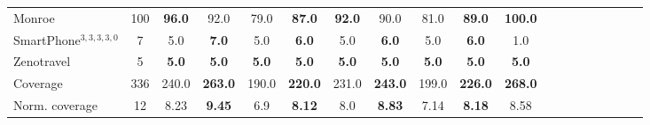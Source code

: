 \documentclass[letterpaper]{article} %
\begin{document}
\begin{table}
{\begin{tabular}{lccccccccccccccccccl}
			\midrule 
			Monroe & 100 & \textbf{96.0} & 92.0 & 79.0 & \textbf{87.0} & \textbf{92.0} & 90.0 & 81.0 & \textbf{89.0} &\multicolumn{2}{c}{ \textbf{100.0}  } \\ 
			SmartPhone$^{3,3,3,3,0}$ & 7 & 5.0 & \textbf{7.0} & 5.0 & \textbf{6.0} & 5.0 & \textbf{6.0} & 5.0 & \textbf{6.0} &\multicolumn{2}{c}{ 1.0  } \\ 
			Zenotravel & 5 & \textbf{5.0} & \textbf{5.0} & \textbf{5.0} & \textbf{5.0} & \textbf{5.0} & \textbf{5.0} & \textbf{5.0} & \textbf{5.0} &\multicolumn{2}{c}{ \textbf{5.0}  } \\ 
			\midrule 
			Coverage & 336 & 240.0 & \textbf{263.0} & 190.0 & \textbf{220.0} & 231.0 & \textbf{243.0} & 199.0 & \textbf{226.0} &\multicolumn{2}{c}{ \textbf{268.0}  } \\ 
			Norm. coverage & 12 & 8.23 & \textbf{9.45} & 6.9 & \textbf{8.12} & 8.0 & \textbf{8.83} & 7.14 & \textbf{8.18} &\multicolumn{2}{c}{ 8.58  } \\ 
			\bottomrule 
		\end{tabular} 
	}
\end{table}
\end{document}
